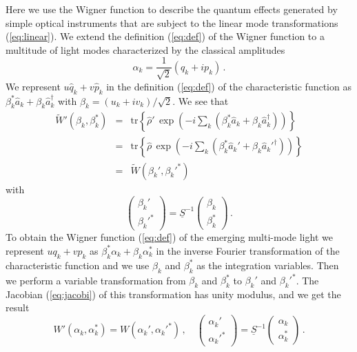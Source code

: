 \documentclass[12pt,amsmath,amssymb]{article}
\numberwithin{equation}{section}
\begin{document}
Here we use the Wigner function to describe the quantum effects
generated by simple optical instruments that are subject to the
linear mode transformations (\ref{eq:linear}). We extend the
definition (\ref{eq:def}) of the Wigner function to a multitude
of light modes characterized by the classical amplitudes
\begin{equation}
\alpha_k = \frac{1}{\sqrt{2}} (q_k+ip_k) \,.
\end{equation}
We represent $u\hat{q}_k+v\hat{p}_k$ in the definition
(\ref{eq:def}) of the characteristic function as
$\beta_k^*\hat{a}_k+\beta_k\hat{a}_k^\dagger$ with
$\beta_k=(u_k+iv_k)/\sqrt{2}$. We see that
\begin{eqnarray}
\widetilde{W}'(\beta_k,\beta_k^*) &=&
\mathrm{tr}\left\{\hat{\rho}'\, \exp\left(-i\sum_k
(\beta_k^*\hat{a}_k+\beta_k\hat{a}_k^\dagger)\right)\right\}
\nonumber\\
&=& \mathrm{tr}\left\{\hat{\rho}\, \exp\left(-i\sum_k
(\beta_k^*\hat{a}_k'+\beta_k\hat{a}_k'^\dagger)\right)\right\}
\nonumber\\
&=& \widetilde{W}(\beta_k',\beta_k'^*)
\end{eqnarray}
with
\begin{equation}
\left(
    \begin{array}{c}
     \beta_k'  \\
     \beta_k'^*
    \end{array}
\right) = \underline{S}^{-1} \left(
    \begin{array}{c}
     \beta_k  \\
     \beta_k^*
    \end{array}
\right)\,.
\end{equation}
To obtain the Wigner function (\ref{eq:def}) of the emerging
multi-mode light we represent $uq_k+vp_k$ as
$\beta_k^*\alpha_k+\beta_k\alpha_k^*$ in the inverse Fourier
transformation of the characteristic function and we use
$\beta_k$ and $\beta_k^*$ as the integration variables. Then we
perform a variable transformation from $\beta_k$ and $\beta_k^*$
to $\beta_k'$ and $\beta_k'^*$. The Jacobian (\ref{eq:jacobi}) of
this transformation has unity modulus, and we get the result
\begin{equation}
\label{eq:wignertrans} W'(\alpha_k,\alpha_k^*) =
W(\alpha_k',\alpha_k'^*) \,,\quad \left(
    \begin{array}{c}
     \alpha_k'  \\
     \alpha_k'^*
    \end{array}
\right) = \underline{S}^{-1} \left(
    \begin{array}{c}
     \alpha_k  \\
     \alpha_k^*
    \end{array}
\right)\,.
\end{equation}
\end{document}
